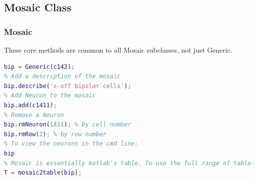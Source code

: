 \documentclass[11pt]{beamer}
\begin{document}
\subsection{Mosaic Class}
\begin{frame}[fragile]
	\frametitle{Mosaic}
	These core methods are common to all Mosaic subclasses, not just Generic.
	\begin{lstlisting}[language=matlab]
% Create a Mosaic by passing a Neuron
bip = Generic(c142);
% Add a description of the mosaic
bip.describe('s-off bipolar cells');
% Add Neuron to the mosaic
bip.add(c1411);
% Remove a Neuron
bip.rmNeuron(1411); % by cell number
bip.rmRow(2); % by row number
% To view the neurons in the cmd line:
bip
% Mosaic is essentially matlab's table. To use the full range of table methods, cast to table:
T = mosaic2table(bip);
\end{lstlisting} 
\end{frame}
\end{document}
